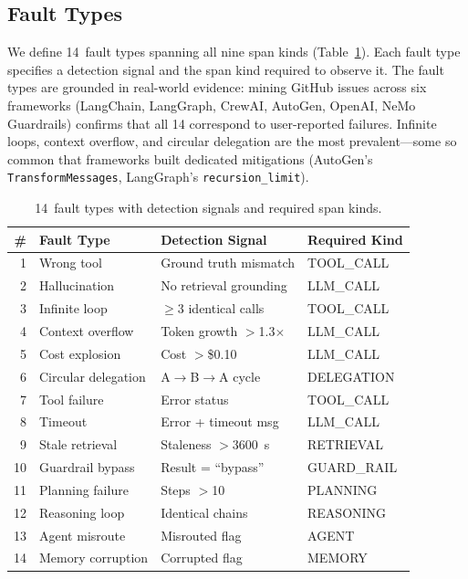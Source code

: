 \documentclass[sigconf,screen]{acmart}
\begin{document}
\subsection{Fault Types}

We define 14~fault types spanning all nine span kinds
(Table~\ref{tab:faults}).  Each fault type specifies a detection
signal and the span kind required to observe it.
The fault types are grounded in real-world evidence: mining GitHub issues
across six frameworks (LangChain, LangGraph, CrewAI, AutoGen, OpenAI,
NeMo Guardrails) confirms that all 14 correspond to user-reported
failures.  Infinite loops, context overflow, and circular delegation are
the most prevalent---some so common that frameworks built dedicated
mitigations (AutoGen's \texttt{TransformMessages}, LangGraph's
\texttt{recursion\_limit}).

\begin{table}[t]
\centering
\scriptsize
\caption{14~fault types with detection signals and required span kinds.}
\label{tab:faults}
\begin{tabular}{@{}rlll@{}}
\toprule
\textbf{\#} & \textbf{Fault Type} & \textbf{Detection Signal} & \textbf{Required Kind} \\
\midrule
1  & Wrong tool          & Ground truth mismatch  & TOOL\_CALL \\
2  & Hallucination       & No retrieval grounding & LLM\_CALL \\
3  & Infinite loop       & $\geq$3 identical calls & TOOL\_CALL \\
4  & Context overflow    & Token growth $>$1.3$\times$ & LLM\_CALL \\
5  & Cost explosion      & Cost $>$\$0.10        & LLM\_CALL \\
6  & Circular delegation & A$\to$B$\to$A cycle    & DELEGATION \\
7  & Tool failure        & Error status           & TOOL\_CALL \\
8  & Timeout             & Error + timeout msg    & LLM\_CALL \\
9  & Stale retrieval     & Staleness $>$3600~s    & RETRIEVAL \\
10 & Guardrail bypass    & Result = ``bypass''    & GUARD\_RAIL \\
11 & Planning failure    & Steps $>$10            & PLANNING \\
12 & Reasoning loop      & Identical chains       & REASONING \\
13 & Agent misroute      & Misrouted flag         & AGENT \\
14 & Memory corruption   & Corrupted flag         & MEMORY \\
\bottomrule
\end{tabular}
\end{table}
\end{document}
